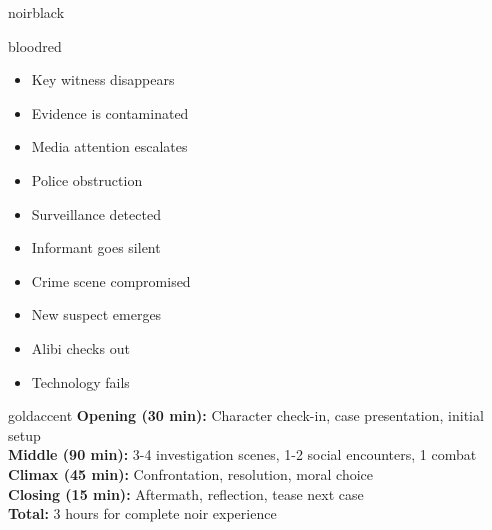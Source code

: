\documentclass[11pt]{article}
\begin{document}
\begin{noirsection}{noirblack}
\begin{mechanicbox}{bloodred}
\begin{multicols}{2}
\begin{itemize}
    \item Key witness disappears
    \item Evidence is contaminated
    \item Media attention escalates
    \item Police obstruction
    \item Surveillance detected
    \item Informant goes silent
    \item Crime scene compromised
    \item New suspect emerges
    \item Alibi checks out
    \item Technology fails
\end{itemize}
\end{multicols}
\end{mechanicbox}

\begin{mechanicbox}{goldaccent}
\textbf{Opening (30 min):} Character check-in, case presentation, initial setup\\
\textbf{Middle (90 min):} 3-4 investigation scenes, 1-2 social encounters, 1 combat\\
\textbf{Climax (45 min):} Confrontation, resolution, moral choice\\
\textbf{Closing (15 min):} Aftermath, reflection, tease next case\\
\textbf{Total:} 3 hours for complete noir experience
\end{mechanicbox}
\end{noirsection}
\end{document}
